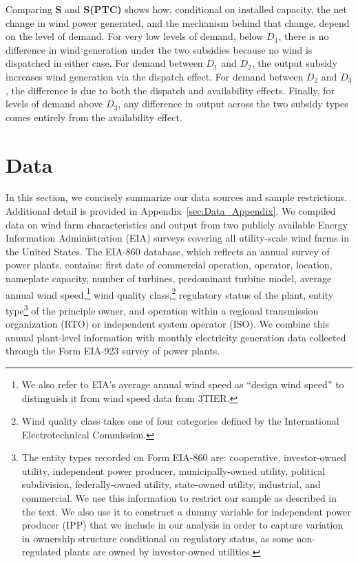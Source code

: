 \documentclass[12pt]{article}
\begin{document}
Comparing \textbf{S} and \textbf{S(PTC)} shows how, conditional on installed capacity, the net change in wind power generated, and the mechanism behind that change, depend on the level of demand. For very low levels of demand, below $D_1$, there is no difference in wind generation under the two subsidies because no wind is dispatched in either case. For demand between $D_1$ and $D_2$, the output subsidy increases wind generation via the dispatch effect. For demand between $D_2$ and $D_3$, the difference is due to both the dispatch and availability effects. Finally, for levels of demand above $D_3$, any difference in output across the two subsidy types comes entirely from the availability effect.

\section{Data\label{sec:Data}}

In this section, we concisely summarize our data sources and sample restrictions. Additional detail is provided in Appendix~\ref{sec:Data_Appendix}. We compiled data on wind farm characteristics and output from two publicly available Energy Information Administration (EIA) surveys covering all utility-scale wind farms in the United States. The EIA-860 database, which reflects an annual survey of power plants, contains: first date of commercial operation, operator, location, nameplate capacity, number of turbines, predominant turbine model, average annual wind speed,\footnote{We also refer to EIA's average annual wind speed as ``design wind speed'' to distinguish it from wind speed data from 3TIER.} wind quality class,\footnote{Wind quality class takes one of four categories defined by the International Electrotechnical Commission.} regulatory status of the plant, entity type\footnote{The entity types recorded on Form EIA-860 are: cooperative, investor-owned utility, independent power producer, municipally-owned utility, political subdivision, federally-owned utility, state-owned utility, industrial, and commercial. We use this information to restrict our sample as described in the text. We also use it to construct a dummy variable for independent power producer (IPP) that we include in our analysis in order to capture variation in ownership structure conditional on regulatory status, as some non-regulated plants are owned by investor-owned utilities.} of the principle owner, and operation within a regional transmission organization (RTO) or independent system operator (ISO). We combine this annual plant-level information with monthly electricity generation data collected through the Form EIA-923 survey of power plants.
\end{document}
